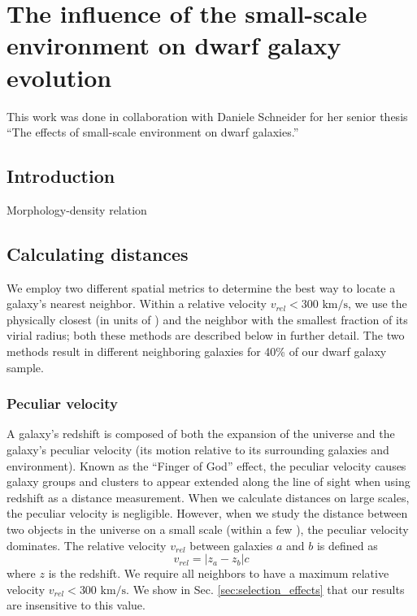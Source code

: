 \chapter[Small-scale environment]{The influence of the small-scale environment on dwarf galaxy evolution}


This work was done in collaboration with Daniele Schneider for her senior thesis 
``The effects of small-scale environment on dwarf galaxies.''




\section[Introduction]{Introduction}

Morphology-density relation \cite{Dressler80}





\section[Theory]{Calculating distances}\label{sec:Theory_dist}

We employ two different spatial metrics to determine the best way to locate a 
galaxy's nearest neighbor.  Within a relative velocity 
$v_{rel} < 300\text{ km/s}$, we use the physically closest (in units of \hMpc) 
and the neighbor with the smallest fraction of its virial radius; both these 
methods are described below in further detail.  The two methods result in 
different neighboring galaxies for 40\% of our dwarf galaxy sample.


\subsection{Peculiar velocity}

A galaxy's redshift is composed of both the expansion of the universe and the 
galaxy's peculiar velocity (its motion relative to its surrounding galaxies and 
environment).  Known as the ``Finger of God'' effect, the peculiar velocity 
causes galaxy groups and clusters to appear extended along the line of sight 
when using redshift as a distance measurement.  When we calculate distances on 
large scales, the peculiar velocity is negligible.  However, when we study the 
distance between two objects in the universe on a small scale (within a few 
\hMpc), the peculiar velocity dominates.  The relative velocity $v_{rel}$ 
between galaxies $a$ and $b$ is defined as
\begin{equation}
    v_{rel} = |z_a - z_b|c
\end{equation}
where $z$ is the redshift.  We require all 
neighbors to have a maximum relative velocity $v_{rel} < 300\text{ km/s}$.  We 
show in Sec. \ref{sec:selection_effects} that our results are insensitive to 
this value.


